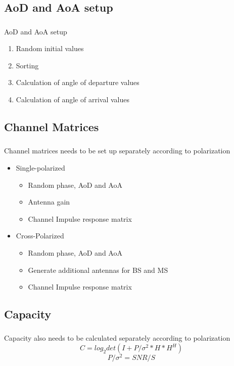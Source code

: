 \documentclass[10pt,aspectratio=169]{beamer}
\begin{document}
		\subsection{AoD and AoA setup}
	\begin{frame}
		\frametitle{\insertsection}
		\framesubtitle{\insertsubsection}	 
        AoD and AoA setup
\begin{enumerate}
\item Random initial values
\item Sorting
\item Calculation of angle of departure values
\item Calculation of angle of arrival values
\end{enumerate}

	\end{frame}
	\subsection{Channel Matrices}
	\begin{frame}
		\frametitle{\insertsection}
		\framesubtitle{\insertsubsection}	 
        Channel matrices needs to be set up separately according to polarization
        \begin{itemize}
			\item<2->  Single-polarized
			\begin{itemize}
			\item Random phase, AoD and AoA
			\item Antenna gain
			\item Channel Impulse response matrix
            \end{itemize}

			\item<3->  Cross-Polarized
			\begin{itemize}
			\item Random phase, AoD and AoA
			\item Generate additional antennas for BS and MS
			\item Channel Impulse response matrix
            \end{itemize}
			
		\end{itemize}

	\end{frame}
	\subsection{Capacity}
	\begin{frame}
		\frametitle{\insertsection}
		\framesubtitle{\insertsubsection}	 
        Capacity also needs to be calculated separately according to polarization
\[C=log_2 det(I+P/\sigma^2*H*H^H)\]
\[P/\sigma^2=SNR/S\]
	\end{frame}
\end{document}

